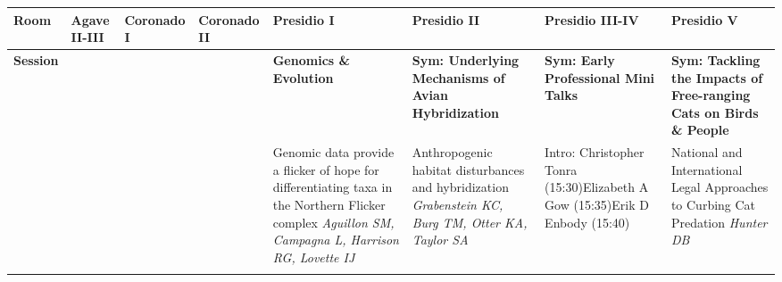 \begin{tabular}{|x{0.85cm}|x{2.85cm}|x{2.85cm}|x{2.85cm}|x{2.85cm}|a{2.85cm}|a{2.85cm}|a{2.85cm}|}\hline
Room & Agave II-III & Coronado I & Coronado II & Presidio I & Presidio II & Presidio III-IV & Presidio V\\
\hline
\rule{0pt}{1em} \textbf{Session} &\footnotesize \textbf{} & \footnotesize \textbf{} & \footnotesize \textbf{} & \footnotesize \textbf{Genomics \& Evolution} & \footnotesize \textbf{Sym: Underlying Mechanisms of Avian Hybridization} & \footnotesize \textbf{Sym: Early Professional Mini Talks} & \footnotesize \textbf{Sym: Tackling the Impacts of Free-ranging Cats on Birds \& People}\\
\hline
{}& \newline \newline \textit{} &  \newline \newline \textit{} &  \newline \newline \textit{} & Genomic data provide a flicker of hope for differentiating taxa in the Northern Flicker complex \newline \newline \textit{Aguillon SM, Campagna L, Harrison RG, Lovette IJ} & Anthropogenic habitat disturbances and hybridization \newline \newline \textit{Grabenstein KC, Burg TM, Otter KA, Taylor SA} & Intro: Christopher  Tonra (15:30)\newline \newline \newline Elizabeth A Gow (15:35)\newline \newline \newline Erik D Enbody (15:40) \newline \newline \textit{} & National and International Legal Approaches to Curbing Cat Predation \newline \newline \textit{Hunter DB}\\

\end{tabular}
